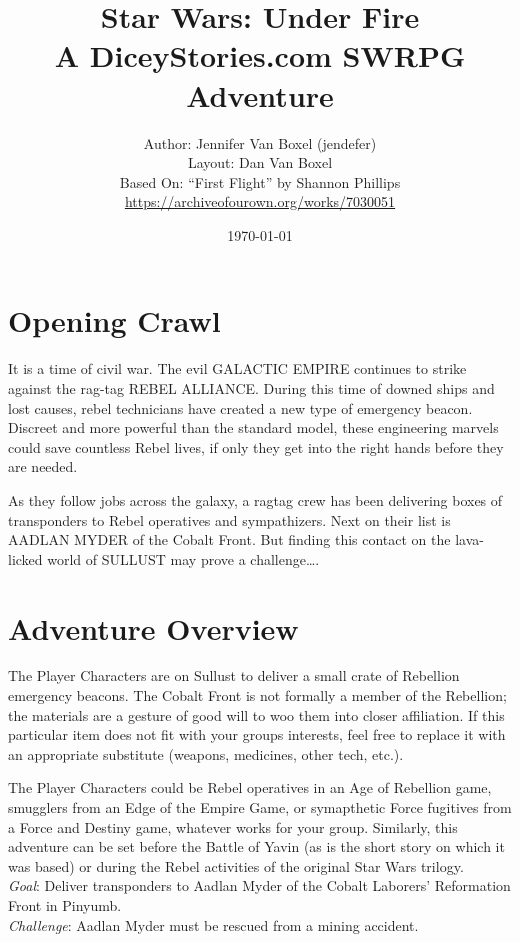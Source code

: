 \documentclass{book}
\title{
Star Wars: Under Fire \\
A DiceyStories.com SWRPG Adventure\\
}
\author{Author: Jennifer Van Boxel (jendefer)\\
        Layout: Dan Van Boxel\\
        Based On: ``First Flight'' by Shannon Phillips \\\url{https://archiveofourown.org/works/7030051}}
\date{\today}
\begin{document}
\maketitle


\begin{multicols*}{2}
\section{Opening Crawl}


It is a time of civil war. The evil GALACTIC EMPIRE continues to strike against the rag-tag REBEL ALLIANCE. During this time of downed ships and lost causes, rebel technicians have created a new type of emergency beacon. Discreet and more powerful than the standard model, these engineering marvels could save countless Rebel lives, if only they get into the right hands before they are needed.

As they follow jobs across the galaxy, a ragtag crew has been delivering boxes of transponders to Rebel operatives and sympathizers. Next on their list is AADLAN MYDER of the Cobalt Front. But finding this contact on the lava-licked world of SULLUST may prove a challenge….



\section{Adventure Overview }

The Player Characters are on Sullust to deliver a small crate of Rebellion emergency beacons. The Cobalt Front is not formally a member of the Rebellion; the materials are a gesture of good will to woo them into closer affiliation. If this particular item does not fit with your groups interests, feel free to replace it with an appropriate substitute (weapons, medicines, other tech, etc.).

The Player Characters could be Rebel operatives in an Age of Rebellion game, smugglers from an Edge of the Empire Game, or symapthetic Force fugitives from a Force and Destiny game, whatever works for your group. Similarly, this adventure can be set before the Battle of Yavin (as is the short story on which it was based) or during the Rebel activities of the original Star Wars trilogy.\\
\emph{Goal}: Deliver transponders to Aadlan Myder of the Cobalt Laborers’ Reformation Front in Pinyumb.\\
\emph{Challenge}: Aadlan Myder must be rescued from a mining accident.


\end{multicols*}
\end{document}

